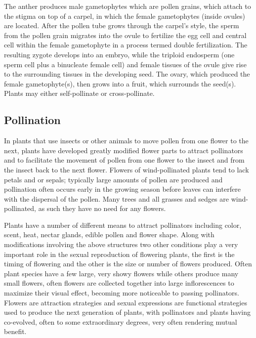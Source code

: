 The anther produces male gametophytes which are pollen grains, which attach to the stigma on top of a carpel, in which the female gametophytes (inside ovules) are located. After the pollen tube grows through the carpel's style, the sperm from the pollen grain migrates into the ovule to fertilize the egg cell and central cell within the female gametophyte in a process termed double fertilization. The resulting zygote develops into an embryo, while the triploid endosperm (one sperm cell plus a binucleate female cell) and female tissues of the ovule give rise to the surrounding tissues in the developing seed. The ovary, which produced the female gametophyte(s), then grows into a fruit, which surrounds the seed(s). Plants may either self-pollinate or cross-pollinate.

\hypertarget{pollination}{%
\subsection{Pollination}\label{pollination}}

In plants that use insects or other animals to move pollen from one flower to the next, plants have developed greatly modified flower parts to attract pollinators and to facilitate the movement of pollen from one flower to the insect and from the insect back to the next flower. Flowers of wind-pollinated plants tend to lack petals and or sepals; typically large amounts of pollen are produced and pollination often occurs early in the growing season before leaves can interfere with the dispersal of the pollen. Many trees and all grasses and sedges are wind-pollinated, as such they have no need for any flowers.

Plants have a number of different means to attract pollinators including color, scent, heat, nectar glands, edible pollen and flower shape. Along with modifications involving the above structures two other conditions play a very important role in the sexual reproduction of flowering plants, the first is the timing of flowering and the other is the size or number of flowers produced. Often plant species have a few large, very showy flowers while others produce many small flowers, often flowers are collected together into large inflorescences to maximize their visual effect, becoming more noticeable to passing pollinators. Flowers are attraction strategies and sexual expressions are functional strategies used to produce the next generation of plants, with pollinators and plants having co-evolved, often to some extraordinary degrees, very often rendering mutual benefit.

